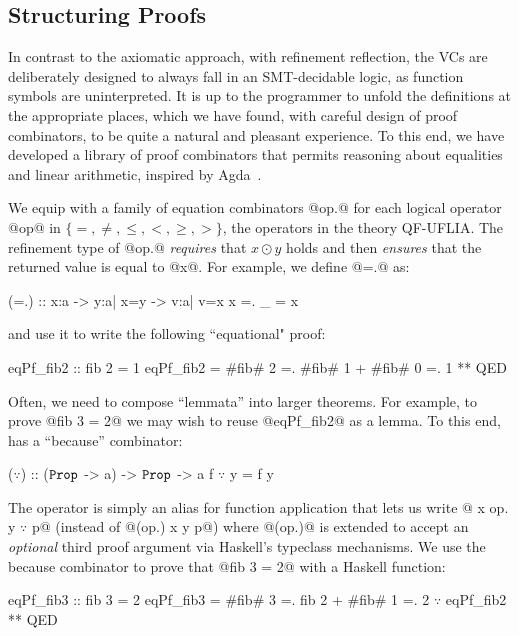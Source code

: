 \subsection{Structuring Proofs}

In contrast to the axiomatic approach,
with refinement reflection, the VCs are
deliberately designed to always fall in
an SMT-decidable logic, as function symbols
are uninterpreted.
%
It is up to the programmer to unfold the
definitions at the appropriate places,
which we have found, with careful design
of proof combinators, to be quite
a natural and pleasant experience.
%
To this end, we have developed a library
of proof combinators that permits reasoning
about equalities and linear arithmetic,
inspired by Agda~\citep{agdaequational}.

%
We equip \toolname with a family of
equation combinators @op.@ for each
logical operator @op@ in
$\{=, \not =, \leq, <, \geq, > \}$,
the operators in the theory QF-UFLIA.
%
The refinement type of @op.@  \emph{requires}
that $x \odot y$ holds and then \emph{ensures}
that the returned value is equal to @x@.
%
For example, we define @=.@ as:
%
\begin{code}
  (=.) :: x:a -> y:{a| x=y} -> {v:a| v=x}
  x =. _ = x
\end{code}
%
and use it to write the following ``equational" proof:
%
\begin{code}
  eqPf_fib2 :: { fib 2 = 1 }
  eqPf_fib2 =  #fib# 2
            =. #fib# 1 + #fib# 0
            =. 1
            ** QED
\end{code} %

%
Often, we need to compose ``lemmata'' into larger
theorems. For example, to prove @fib 3 = 2@ we
may wish to reuse @eqPf_fib2@ as a lemma.
%
To this end, \toolname has a ``because'' combinator:
%
\begin{mcode}
  ($\because$) :: ($\texttt{Prop}$ -> a) -> $\texttt{Prop}$ -> a
  f $\because$ y = f y
\end{mcode}
%
The operator is simply an alias for function
application that lets us write
%
@ x op. y $\because$ p@ (instead of @(op.) x y p@)
where @(op.)@ is extended to accept an \textit{optional} third proof
argument via Haskell's typeclass mechanisms.
%
We use the because combinator to
prove that @fib 3 = 2@ with a Haskell function:
%
\begin{mcode}
  eqPf_fib3 :: { fib 3 = 2 }
  eqPf_fib3 =  #fib# 3
            =. fib 2 + #fib# 1
            =. 2              $\because$ eqPf_fib2
            ** QED
\end{mcode}

